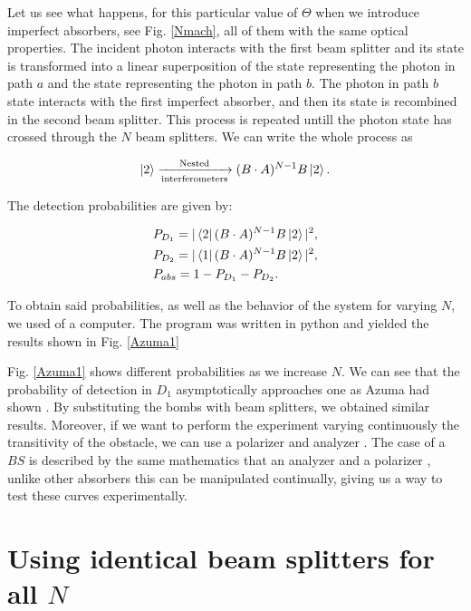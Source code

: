 \documentclass[12pt]{book}
\begin{document}
  Let us see what happens, for this particular value of $\Theta$ when we introduce imperfect absorbers, see Fig. \ref{Nmach}, all of them with the same optical properties. The incident photon interacts with the first beam splitter and its state is transformed into a linear superposition of the state representing the photon in path $a$ and the state representing the photon in path $b$. The photon in path $b$ state interacts with the first imperfect absorber, and then its state is recombined in the second beam splitter. This process is repeated untill the photon state has crossed through the $N$ beam splitters. We can write the whole process as 


\begin{equation}\ket{2}\xrightarrow[\text{interferometers}]{\text{Nested}}(B \cdot A)^{N-1}B \ket{2}.
\end{equation}

The detection probabilities are given by:

\begin{align}
&P_{D_{1}}=|\bra{2} (B \cdot A)^{N-1}B \ket{2}|^2,\\
&P_{D_{2}}=|\bra{1} (B \cdot A)^{N-1}B \ket{2}|^2,\\
&P_{abs}=1-P_{D_{1}}-P_{D_{2}}.
\label{comentatio}
\end{align}
 
 
To obtain said probabilities, as well as the behavior of the system for varying $N$, we used of a computer. The program was written in python and yielded the results shown in Fig. \ref{Azuma1}




Fig. \ref{Azuma1} shows  different probabilities as we increase $N$. We can see that the probability of detection in $D_{1}$ asymptotically approaches one as Azuma had shown \cite{Azuma}. By substituting the bombs with beam splitters, we obtained similar results. Moreover, if we want to perform the experiment varying continuously the transitivity of the obstacle, we can use a polarizer and analyzer \cite{nosirve}.  The case of a $BS$ is described by the same mathematics that an analyzer and a polarizer \cite{nosirve}, unlike other absorbers this can be manipulated continually, giving us a way to test these curves experimentally. 



 \section{Using identical beam splitters for all $N$}
 
\end{document}

